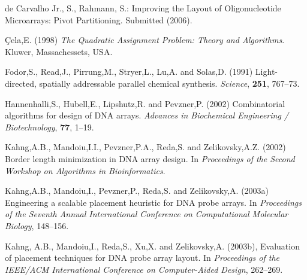 \documentclass[english]{lni}
\newcommand{\ignore}[1]{}
\begin{document}
\begin{thebibliography}{9}

\ignore{
\bibitem{BINDER05} Binder,H. and Preibisch,S. (2005)
Specific and nonspecific hybridization of oligonucleotide probes on microarrays.
{\it Biophysical Journal}, {\bf 89}, 337--352.
}

de Carvalho Jr., S., Rahmann, S.:
Improving the Layout of Oligonucleotide Microarrays: Pivot Partitioning.
Submitted (2006).


 \c{C}ela,E. (1998) {\it The Quadratic
Assignment Problem: Theory and Algorithms}. Kluwer, Massachessets, USA.
\ignore{
\bibitem{CHASE76} Chase,P.J. (1976) Subsequence numbers and
logarithmic concavity. {\it Discrete Mathematics} {\bf 16}, 123--140.
\bibitem{FELDMAN93} Feldman,W. and Pevzner,P. (1994)
Gray code masks for sequencing by hibridization. {\it Genomics}, {\bf 23},
233--235.
\bibitem{FEO95} Feo,T.A. and Resende,M.G.C. (1995) Greedy
randomized adaptive search procedures. {\it Journal of Global Optimization},
{\bf 6}, 109--133.
}

 Fodor,S., Read,J., Pirrung,M.,
Stryer,L., Lu,A. and Solas,D. (1991) Light-directed, spatially addressable
parallel chemical synthesis. {\it Science}, {\bf 251}, 767--73.

 Hannenhalli,S.,
Hubell,E., Lipshutz,R. and Pevzner,P. (2002) Combinatorial algorithms for design
of DNA arrays. {\it Advances in Biochemical Engineering / Biotechnology},
{\bf 77}, 1--19.

 Kahng,A.B., Mandoiu,I.I.,
Pevzner,P.A., Reda,S. and Zelikovsky,A.Z. (2002) Border length minimization in
DNA array design. In {\it Proceedings of the Second Workshop on Algorithms in
Bioinformatics}.

 Kahng,A.B., Mandoiu,I.,
Pevzner,P., Reda,S. and Zelikovsky,A. (2003a) Engineering a scalable placement
heuristic for DNA probe arrays. In {\it Proceedings of the Seventh Annual
International Conference on Computational Molecular Biology}, 148--156.

 Kahng, A.B., Mandoiu,I., Reda,S.,
Xu,X. and Zelikovsky,A. (2003b), Evaluation of placement techniques for DNA
probe array layout. In {\it Proceedings of the IEEE/ACM International Conference
on Computer-Aided Design}, 262--269.


\end{thebibliography}
\end{document}
